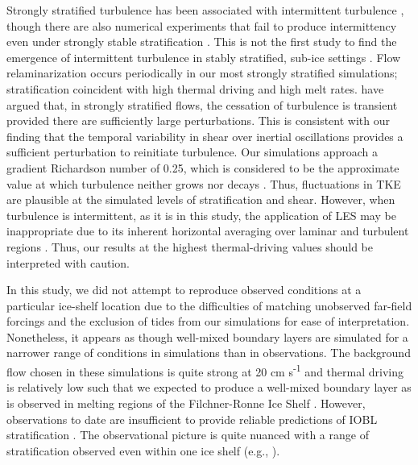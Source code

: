 \documentclass[draft]{agujournal2019}
\begin{document}
Strongly stratified turbulence has been associated with intermittent turbulence \cite{nieuwstadt_direct_2005, wiel_cessation_2012}, though there are also numerical experiments that fail to produce intermittency even under strongly stable stratification \cite{arya_buoyancy_1975, komori_turbulence_1983}. This is not the first study to find the emergence of intermittent turbulence in stably stratified, sub-ice settings \cite{vreugdenhil_stratification_2019}. Flow relaminarization occurs periodically in our most strongly stratified simulations; stratification coincident with high thermal driving and high melt rates.  have argued that, in strongly stratified flows, the cessation of turbulence is transient provided there are sufficiently large perturbations. This is consistent with our finding that the temporal variability in shear over inertial oscillations provides a sufficient perturbation to reinitiate turbulence. Our simulations approach a gradient Richardson number of 0.25, which is considered to be the approximate value at which turbulence neither grows nor decays \cite{rohr_growth_1988, holt_numerical_1992}. Thus, fluctuations in TKE are plausible at the simulated levels of stratification and shear. However, when turbulence is intermittent, as it is in this study, the application of LES may be inappropriate due to its inherent horizontal averaging over laminar and turbulent regions \cite{stoll_large-eddy_2008}. Thus, our results at the highest thermal-driving values should be interpreted with caution. 

In this study, we did not attempt to reproduce observed conditions at a particular ice-shelf location due to the difficulties of matching unobserved far-field forcings and the exclusion of tides from our simulations for ease of interpretation. Nonetheless, it appears as though well-mixed boundary layers are simulated for a narrower range of conditions in simulations than in observations. The background flow chosen in these simulations is quite strong at 20 cm s\textsuperscript{-1} and thermal driving is relatively low such that we expected to produce a well-mixed boundary layer as is observed in melting regions of the Filchner-Ronne Ice Shelf \cite{nicholls_oceanographic_2001}. However, observations to date are insufficient to provide reliable predictions of IOBL stratification \cite{malyarenko_synthesis_2020}. The observational picture is quite nuanced with a range of stratification observed even within one ice shelf (e.g., ). 
\end{document}
